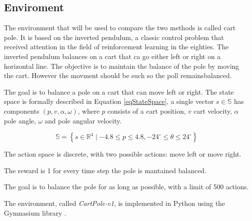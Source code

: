 \subsection{Enviroment}
\label{sec:Enviroment}
The environment that will be used to compare the two methods is called cart pole. It is based on the inverted pendulum, a classic control problem that received attention in the field of reinforcement learning in the eighties. The inverted pendulum balances on a cart that ca go either left or right on a horizontal line. The objective is to maintain the balance of the pole by moving the cart. However the movment should be such so the poll remainsbalanced\cite{moriarty1996efficient}.

The goal is to balance a pole on a cart that can move left or right. 
The state space is formally described in Equation \ref{eqStateSpace}, a single vector $s \in \mathbb{S}$ has components $(p, v, \alpha, \omega)$, where $p$ consists of a cart position, $v$ cart velocity, $\alpha$ pole angle, $\omega$ and pole angular velocity.

\begin{equation} \label{eqStateSpace}
{\mathbb{S} = \left\{ s \in \mathbb{R}^4 \mid -4.8 \leq p \leq 4.8, 
 -24^\circ \leq \theta \leq 24^\circ \right\}}
\end{equation}

The action space is discrete, with two possible actions: move left or move right. 

The reward is 1 for every time step the pole is mantained balanced.

The goal is to balance the pole for as long as possible, with a limit of 500 actions.

The environment, called \textit{CartPole-v1}, is implemented in Python using the Gymnasium library \cite{towers_gymnasium_2023}. 
